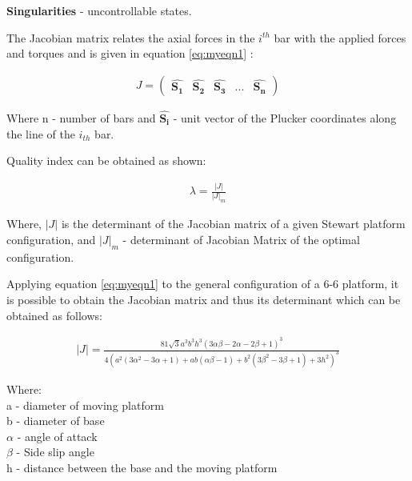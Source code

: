  \textbf{Singularities} - uncontrollable states.
 
 The Jacobian matrix relates the axial forces in the $i^{th}$ bar with the applied
 forces and torques and is given in equation \eqref{eq:myeqn1} \cite{fernandes_design_nodate}:
 
 \begin{ceqn}
 	\begin{align}
 		J =
 		\begin{pmatrix}
 		\hat{\boldsymbol{S_{1}}} & \hat{\boldsymbol{S_{2}}} & \hat{\boldsymbol{S_{3}}} & ... & \hat{\boldsymbol{S_{n}}}
 		\end{pmatrix}
 		\label{eq:myeqn1}
 	\end{align}
 \end{ceqn}
 
 Where n - number of bars and $ \hat{\boldsymbol{S_{i}}}$ - unit vector of the Plucker coordinates along the line of the
 $i_{th}$ bar.
 
 Quality index can be obtained as shown:
 \begin{ceqn}
 	\begin{align}
 		\lambda = \frac{|J|}{|J|_{m}}
 		\label{eq:myeqn}			
 	\end{align}
 \end{ceqn}
 Where, $|J|$ is the determinant of the Jacobian matrix of a given Stewart platform configuration, and $ |J|_{m} $ - determinant of Jacobian Matrix of the optimal configuration.
 
 Applying equation \eqref{eq:myeqn1} to the general configuration of a 6-6 platform, it is
 possible to obtain the Jacobian matrix and thus its determinant which can be obtained as follows:
 \begin{ceqn}
 	\begin{align}
 		|J| =
 \frac{81 \sqrt{3} a^3 b^3 h^3 (3 \alpha \beta - 2 \alpha - 2 \beta +1)^3}{4(a^2(3 \alpha^2 - 3 \alpha + 1)+ ab(\alpha \beta - 1 )+ b^2(3 \beta^2 - 3 \beta + 1)+ 3h^2)^3}
 \label{eq:myeqn02}
 	\end{align}
 \end{ceqn}
 Where:\\
 a - diameter of moving platform\\
 b - diameter of base\\
 $\alpha$ - angle of attack\\
 $ \beta $ - Side slip angle\\
 h - distance between the base and the moving platform\\
 
